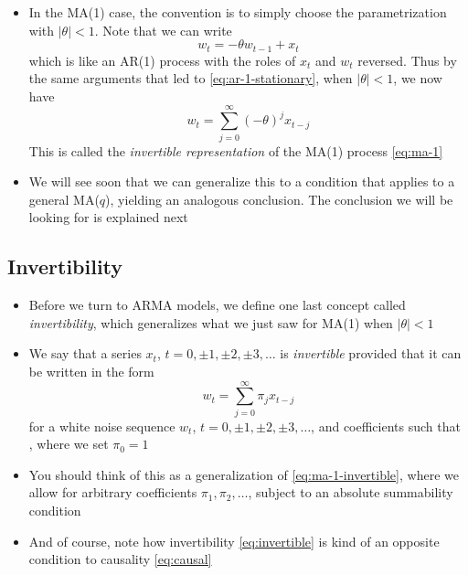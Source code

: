 \documentclass{article}
\begin{document}
\begin{itemize}
\item In the MA(1) case, the convention is to simply choose the parametrization
  with $|\theta| <  1$. Note that we can write
  \[
  w_t = -\theta w_{t-1} + x_t 
  \]
  which is like an AR(1) process with the roles of $x_t$ and $w_t$
  reversed. Thus by the same arguments that led to \eqref{eq:ar-1-stationary},
  when $|\theta| < 1$, we now have 
  \begin{equation}
  \label{eq:ma-1-invertible}
  w_t = \sum_{j=0}^\infty (-\theta)^j x_{t-j} 
  \end{equation}
  This is called the \emph{invertible representation} of the MA(1) process
  \eqref{eq:ma-1} 

\item We will see soon that we can generalize this to a condition that applies
  to a general MA($q$), yielding an analogous conclusion. The conclusion we will
  be looking for is explained next 
\end{itemize}

\subsection{Invertibility}

\begin{itemize}
\item Before we turn to ARMA models, we define one last concept called
  \emph{invertibility}, which generalizes what we just saw for MA(1) when
  $|\theta| < 1$ 

\item We say that a series $x_t$, $t = 0, \pm 1, \pm 2, \pm 3, \dots$ is
  \emph{invertible} provided that it can be written in the form
  \begin{equation}
  \label{eq:invertible}
  w_t = \sum_{j=0}^\infty \pi_j x_{t-j}
  \end{equation}
  for a white noise sequence $w_t$, $t = 0, \pm 1, \pm 2, \pm 3, \dots$,
  and coefficients such that , where 
  we set $\pi_0 = 1$

\item You should think of this as a generalization of
  \eqref{eq:ma-1-invertible}, where we allow for arbitrary coefficients
  $\pi_1,\pi_2,\dots$, subject to an absolute summability condition   

\item And of course, note how invertibility \eqref{eq:invertible} is kind of an
  opposite condition to causality \eqref{eq:causal}  
\end{itemize}
\end{document}
